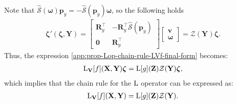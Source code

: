 Note that $\widehat{\mathcal{S}}(\boldsymbol{\omega})\mathbf{p}_y = -\widehat{\mathcal{S}}(\mathbf{p}_y)\boldsymbol{\omega}$, so the following holds
\begin{align}
    \boldsymbol{\zeta}'(\boldsymbol{\zeta}, \mathbf{Y}) = \begin{bmatrix}
        \mathbf{R}_y^\top & -\mathbf{R}_y^\top\widehat{\mathcal{S}}(\mathbf{p}_y)\\
        \mathbf{0} & \mathbf{R}_y^\top
    \end{bmatrix}\begin{bmatrix}
        \mathbf{v}\\\boldsymbol{\omega}
    \end{bmatrix}
    = \mathcal{Z}(\mathbf{Y})\boldsymbol{\zeta}.
\end{align}
Thus, the expression \eqref{app:prop-Lop-chain-rule-LVf-final-form} becomes:
\begin{align}
    \operatorname{L}_\mathbf{V}[f](\mathbf{X}, \mathbf{Y})\boldsymbol{\zeta} = \operatorname{L}[g](\mathbf{Z})\mathcal{Z}(\mathbf{Y})\boldsymbol{\zeta},
\end{align}
which implies that the chain rule for the $\operatorname{L}$ operator can be expressed as:
\begin{align}
    \operatorname{L}_\mathbf{V}[f](\mathbf{X}, \mathbf{Y}) = \operatorname{L}[g](\mathbf{Z})\mathcal{Z}(\mathbf{Y}). \label{eq:appendix-prop-Lop-chain-rule-SE3}
\end{align}